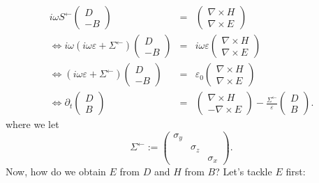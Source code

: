 \begin{eqnarray*}
  i \omega S^{\leftarrow} \left(\begin{array}{c}
    D\\
    - B
  \end{array}\right) & = & \left(\begin{array}{c}
    \nabla \times H\\
    \nabla \times E
  \end{array}\right)\\
  \Leftrightarrow i \omega (i \omega \varepsilon + \Sigma^{\leftarrow})
  \left(\begin{array}{c}
    D\\
    - B
  \end{array}\right) & = & i \omega \varepsilon \left(\begin{array}{c}
    \nabla \times H\\
    \nabla \times E
  \end{array}\right)\\
  \Leftrightarrow (i \omega \varepsilon + \Sigma^{\leftarrow})
  \left(\begin{array}{c}
    D\\
    - B
  \end{array}\right) & = & \varepsilon_0 \left(\begin{array}{c}
    \nabla \times H\\
    \nabla \times E
  \end{array}\right)\\
  \Leftrightarrow \partial_t \left(\begin{array}{c}
    D\\
    B
  \end{array}\right) & = & \left(\begin{array}{c}
    \nabla \times H\\
    - \nabla \times E
  \end{array}\right) - \frac{\Sigma^{\leftarrow}}{\varepsilon}
  \left(\begin{array}{c}
    D\\
    B
  \end{array}\right) .
\end{eqnarray*}
where we let
\[ \Sigma^{\leftarrow} := \left(\begin{array}{ccc}
     \sigma_y &  & \\
     & \sigma_z & \\
     &  & \sigma_x
   \end{array}\right) . \]
Now, how do we obtain $E$ from $D$ and $H$ from $B$? Let's tackle $E$ first:
